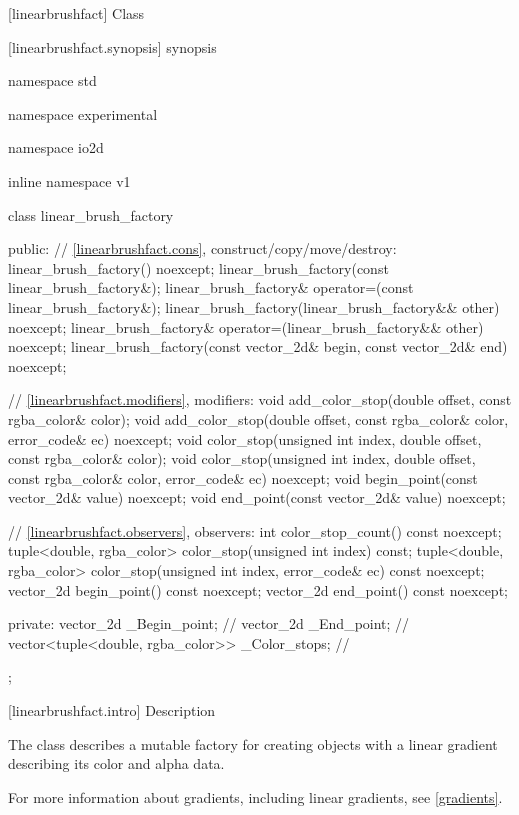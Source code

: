  [linearbrushfact] {Class }

 [linearbrushfact.synopsis] { synopsis}

\begin{codeblock}
namespace std { namespace experimental { namespace io2d { inline namespace v1 {
  class linear_brush_factory {
  public:
    // \ref{linearbrushfact.cons}, construct/copy/move/destroy:
    linear_brush_factory() noexcept;
    linear_brush_factory(const linear_brush_factory&);
    linear_brush_factory& operator=(const linear_brush_factory&);
    linear_brush_factory(linear_brush_factory&& other) noexcept;
    linear_brush_factory& operator=(linear_brush_factory&& other) noexcept;
    linear_brush_factory(const vector_2d& begin, const vector_2d& end) noexcept;

    // \ref{linearbrushfact.modifiers}, modifiers:
    void add_color_stop(double offset, const rgba_color& color);
    void add_color_stop(double offset, const rgba_color& color, 
      error_code& ec) noexcept;
    void color_stop(unsigned int index, double offset,
      const rgba_color& color);
    void color_stop(unsigned int index, double offset,
      const rgba_color& color, error_code& ec) noexcept;
    void begin_point(const vector_2d& value) noexcept;
    void end_point(const vector_2d& value) noexcept;

    // \ref{linearbrushfact.observers}, observers:
    int color_stop_count() const noexcept;
    tuple<double, rgba_color> color_stop(unsigned int index) const;
    tuple<double, rgba_color> color_stop(unsigned int index,
      error_code& ec) const noexcept;
    vector_2d begin_point() const noexcept;
    vector_2d end_point() const noexcept;

  private:
    vector_2d _Begin_point;                             // \expos
    vector_2d _End_point;                               // \expos
    vector<tuple<double, rgba_color>> _Color_stops; // \expos
  };
} } } }
\end{codeblock}

 [linearbrushfact.intro] { Description}

\pnum
{}
The class  describes a mutable factory for creating  objects with a linear gradient describing its color and alpha data.

\pnum
For more information about gradients, including linear gradients, see \ref{gradients}.

